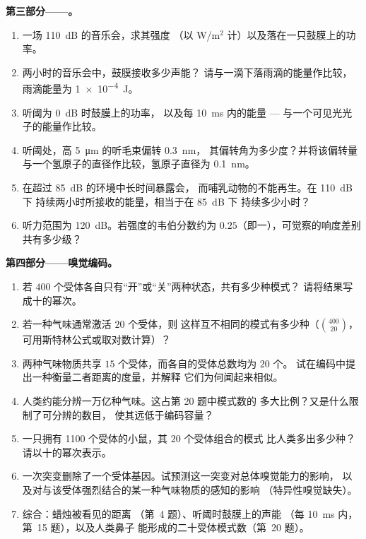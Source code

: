 \begin{problem}
\medskip
\noindent\textbf{第三部分——。}
\begin{enumerate}[resume]
  \item 一场 \qty{110}{dB} 的音乐会，求其强度
        （以 W/m$^{2}$ 计）以及落在一只鼓膜上的功率。
  \item 两小时的音乐会中，鼓膜接收多少声能？
        请与一滴下落雨滴的能量作比较，
        雨滴能量为 \qty{1e-4}{J}。
  \item 听阈为 \qty{0}{dB} 时鼓膜上的功率，
        以及每 \qty{10}{ms} 内的能量 ---
        与一个可见光光子的能量作比较。
  \item 听阈处，高 \qty{5}{\micro m} 的听毛束偏转 \qty{0.3}{nm}，
        其偏转角为多少度？并将该偏转量
        与一个氢原子的直径作比较，氢原子直径为
        \qty{0.1}{nm}。
  \item 在超过 \qty{85}{dB} 的环境中长时间暴露会，
        而哺乳动物的不能再生。在 \qty{110}{dB} 下
        持续两小时所接收的能量，相当于在 \qty{85}{dB} 下
        持续多少小时？
  \item 听力范围为 \qty{120}{dB}。若强度的韦伯分数约为
        $0.25$（即一），可觉察的响度差别
        共有多少级？
\end{enumerate}

\medskip
\noindent\textbf{第四部分——嗅觉编码。}
\begin{enumerate}[resume]
  \item 若 $400$ 个受体各自只有“开”或“关”两种状态，共有多少种模式？
        请将结果写成十的幂次。
  \item 若一种气味通常激活 $20$ 个受体，则
        这样互不相同的模式有多少种（$\binom{400}{20}$，
        可用斯特林公式或取对数计算）？
  \item 两种气味物质共享 $15$ 个受体，而各自的受体总数均为 $20$ 个。
        试在编码中提出一种衡量二者距离的度量，并解释
        它们为何闻起来相似。
  \item 人类约能分辨一万亿种气味。这占第 20 题中模式数的
        多大比例？又是什么限制了可分辨的数目，
        使其远低于编码容量？
  \item 一只拥有 \num{1100} 个受体的小鼠，其 $20$ 个受体组合的模式
        比人类多出多少种？请以十的幂次表示。
  \item 一次突变删除了一个受体基因。试预测这一突变对总体嗅觉能力的影响，
        以及对与该受体强烈结合的某一种气味物质的感知的影响
        （特异性嗅觉缺失）。
  \item 综合：蜡烛被看见的距离
        （第~4 题）、听阈时鼓膜上的声能
        （每 \qty{10}{ms} 内，第~15 题），以及人类鼻子
        能形成的二十受体模式数（第~20 题）。
\end{enumerate}
\end{problem}
